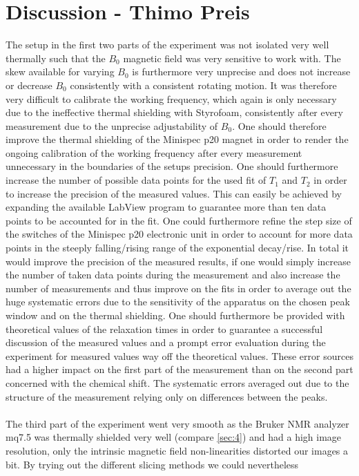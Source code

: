 
\section{Discussion - Thimo Preis}
The setup in the first two parts of the experiment was not isolated very well thermally such that the $B_0$ magnetic field was very sensitive to work with. The skew available for varying $B_0$ is furthermore very unprecise and does not increase or decrease $B_0$ consistently with a consistent rotating motion. It was therefore very difficult to calibrate the working frequency, which again is only necessary due to the ineffective thermal shielding with Styrofoam, consistently after every measurement due to the unprecise adjustability of $B_0$. One should therefore improve the thermal shielding of the Minispec p20 magnet in order to render the ongoing calibration of the working frequency after every measurement unnecessary in the boundaries of the setups precision. One should furthermore increase the number of possible data points for the used fit of $T_1$ and $T_2$ in order to increase the precision of the measured values. This can easily be achieved by expanding the available LabView program to guarantee more than ten data points to be accounted for in the fit. One could furthermore refine the step size of the switches of the Minispec p20 electronic unit in order to account for more data points in the steeply falling/rising range of the exponential decay/rise. In total it would improve the precision of the measured results, if one would simply increase the number of taken data points during the measurement and also increase the number of measurements and thus improve on the fits in order to average out the huge systematic errors due to the sensitivity of the apparatus on the chosen peak window and on the thermal shielding.  One should furthermore be provided with theoretical values of the relaxation times in order to guarantee a successful discussion of the measured values and a prompt error evaluation during the experiment for measured values way off the theoretical values. These error sources had a higher impact on the first part of the measurement than on the second part concerned with the chemical shift. The systematic errors averaged out due to the structure of the measurement relying only on differences between the peaks.\\
\\
The third part of the experiment went very smooth as the Bruker NMR analyzer mq7.5 was thermally shielded very well (compare \ref{sec:4}) and had a high image resolution, only the intrinsic magnetic field non-linearities distorted our images a bit. By trying out the different slicing methods we could nevertheless 
